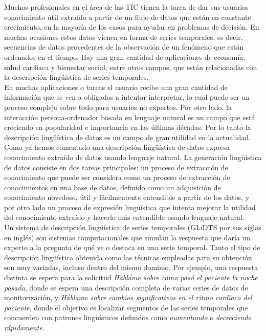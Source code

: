 \documentclass[10pt,a4paper]{article}
\begin{document}
Muchos profesionales en el área de las TIC tienen la tarea de dar sus usuarios conocimiento útil extraído a partir de un flujo de datos que están en constante crecimiento, en la mayoría de los casos para ayudar en problemas de decisión. En muchas ocasiones estos datos vienen en forma de series temporales, es decir, secuencias de datos procedentes de la observación de un fenómeno que están ordenados en el tiempo. Hay una gran cantidad de aplicaciones de economía, salud cardíaca y bienestar social, entre otros campos, que están relacionadas con la descripción lingüística de series temporales.\\

En muchas aplicaciones o tareas el usuario recibe una gran cantidad de información que se ven a obligados a intentar interpretar, lo cual puede ser un proceso complejo sobre todo para usuarios no expertos. Por otro lado, la interacción persona-ordenador basada en lenguaje natural es un campo que está creciendo en popularidad e importancia en las últimas décadas. Por lo tanto la descripción lingüística de datos es un campo de gran utilidad en la actualidad.\\

Como ya hemos comentado una descripción lingüística de datos expresa conocimiento extraído de datos usando lenguaje natural. La generación lingüística de datos consiste en dos tareas principales: un proceso de extracción de conocimiento que puede ser considera como un proceso de extracción de conocimientos en una base de datos, definido como un adquisición de conocimiento novedoso, útil y fácilmentente entendible a partir de los datos, y por otro lado un proceso de expresión lingüística que intenta mejorar la utilidad del conocimiento extraído y hacerlo más entendible usando lenguaje natural.\\
 
Un sistema de descripción lingüística de series temporales (GLiDTS por sus siglas en inglés) son sistemas computacionales que simulan la respuesta que daría un experto a la pregunta de qué ve o destaca en una serie temporal. Tanto el tipo de descripción lingüística obtenida como las técnicas empleadas para su obtención son muy variadas, incluso dentro del mismo dominio. Por ejemplo, una respuesta distinta se espera para la solicitud \textit{Habláme sobre cómo pasó el paciente la noche pasada}, donde se espera una descripción completa de varias series de datos de monitorización, y \textit{Háblame sobre cambios significativos en el ritmo cardíaco del paciente}, donde el objetivo es localizar segmentos de las series temporales que concuerden con patrones lingüísticos definidos como \textit{aumentando} o \textit{decreciendo rápidamente}.\\
\end{document}
